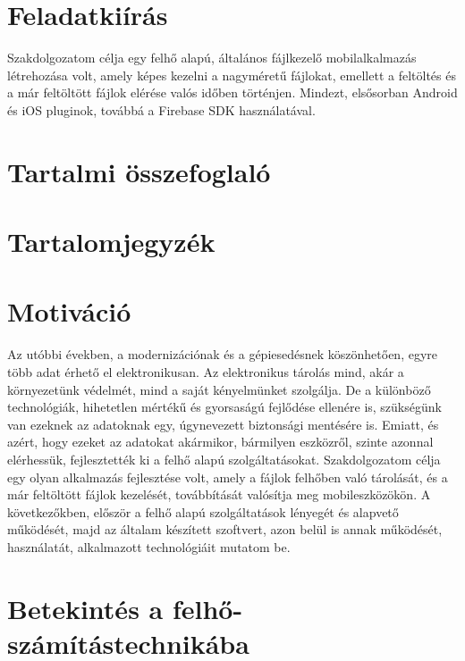 \documentclass[12pt]{report}
\begin{document}


\chapter*{Feladatkiírás}
Szakdolgozatom célja egy felhő alapú, általános fájlkezelő mobilalkalmazás létrehozása volt, amely képes kezelni a nagyméretű fájlokat, emellett a feltöltés és a már feltöltött fájlok elérése valós időben történjen. Mindezt, elsősorban Android és iOS pluginok, továbbá a Firebase SDK használatával.

\begingroup
\renewcommand{\cleardoublepage}{}
\renewcommand{\clearpage}{}
\chapter*{Tartalmi összefoglaló}
\endgroup


\chapter*{Tartalomjegyzék}


\chapter*{Motiváció}
Az utóbbi években, a modernizációnak és a gépiesedésnek köszönhetően, egyre több adat érhető el elektronikusan. Az elektronikus tárolás mind, akár a környezetünk védelmét, mind a saját kényelmünket szolgálja. De a különböző technológiák, hihetetlen mértékű és gyorsaságú fejlődése ellenére is, szükségünk van ezeknek az adatoknak egy, úgynevezett biztonsági mentésére is. Emiatt, és azért, hogy ezeket az adatokat akármikor, bármilyen eszközről, szinte azonnal elérhessük, fejlesztették ki a felhő alapú szolgáltatásokat.
Szakdolgozatom célja egy olyan alkalmazás fejlesztése volt, amely a fájlok felhőben való tárolását, és a már feltöltött fájlok kezelését, továbbítását valósítja meg mobileszközökön. A következőkben, először a felhő alapú szolgáltatások lényegét és alapvető működését, majd az általam készített szoftvert, azon belül is annak működését, használatát, alkalmazott technológiáit mutatom be.

\chapter{Betekintés a felhő-számítástechnikába}
\end{document}
